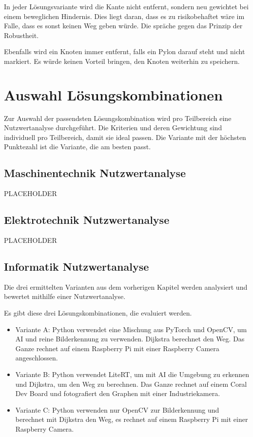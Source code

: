 In jeder Lösungsvariante wird die Kante nicht entfernt, sondern neu gewichtet bei einem beweglichen Hindernis. Dies liegt daran, dass es zu risikobehaftet wäre im Falle, dass es sonst keinen Weg geben würde. Die spräche gegen das Prinzip der Robustheit.

Ebenfalls wird ein Knoten immer entfernt, falls ein Pylon darauf steht und nicht markiert. Es würde keinen Vorteil bringen, den Knoten weiterhin zu speichern.


\newpage
\section{Auswahl Lösungskombinationen}

Zur Auswahl der passendsten Lösungskombination wird pro Teilbereich eine Nutzwertanalyse durchgeführt. Die Kriterien und deren Gewichtung sind individuell pro Teilbereich, damit sie ideal passen. Die Variante mit der höchsten Punktezahl ist die Variante, die am besten passt.

\subsection{Maschinentechnik Nutzwertanalyse}

PLACEHOLDER

\subsection{Elektrotechnik Nutzwertanalyse}

PLACEHOLDER

\subsection{Informatik Nutzwertanalyse}

Die drei ermittelten Varianten aus dem vorherigen Kapitel werden analysiert und bewertet mithilfe einer Nutzwertanalyse.

Es gibt diese drei Lösungskombinationen, die evaluiert werden.

\begin{itemize}
     \item Variante A: Python verwendet eine Mischung aus PyTorch und OpenCV, um AI und reine Bilderkennung zu verwenden. Dijkstra berechnet den Weg. Das Ganze rechnet auf einem Raspberry Pi mit einer Raspberry Camera angeschlossen.
    \item  Variante B: Python verwendet LiteRT, um mit AI die Umgebung zu erkennen und Dijkstra, um den Weg zu berechnen. Das Ganze rechnet auf einem Coral Dev Board und fotografiert den Graphen mit einer Industriekamera.
    \item Variante C: Python verwenden nur OpenCV zur Bilderkennung und berechnet mit Dijkstra den Weg, es rechnet auf einem Raspberry Pi mit einer Raspberry Camera.
\end{itemize}

